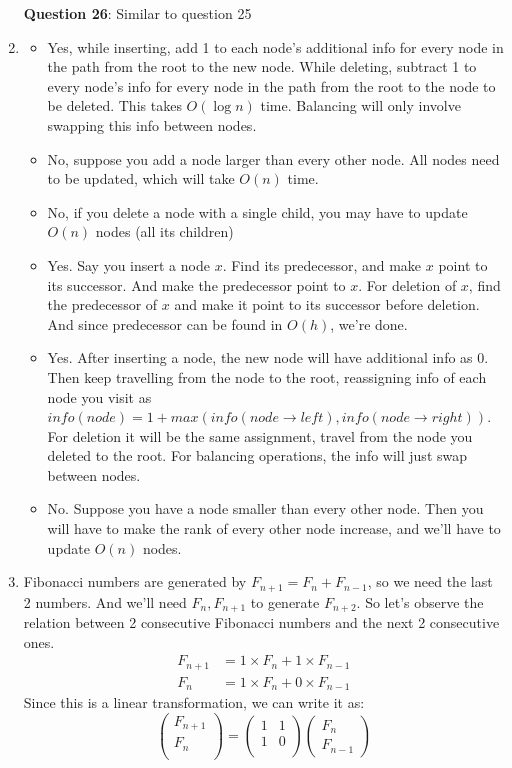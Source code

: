 \documentclass[12pt]{report}
\begin{document}
\begin{enumerate}[label=\textbf{\arabic*.}]
  \textbf{Question 26}:
  Similar to question 25

  \item 
  \begin{itemize}
    \item Yes, while inserting, add 1 to each node's additional info for every node in the path from the root to the new node. While deleting, 
    subtract 1 to every node's info for every node in the path from the root to the node to be deleted. This takes $O(\log n)$ time. Balancing 
    will only involve swapping this info between nodes.
    \item No, suppose you add a node larger than every other node. All nodes need to be updated, which will take $O(n)$ time.
    \item No, if you delete a node with a single child, you may have to update $O(n)$ nodes (all its children)
    \item Yes. Say you insert a node $x$. Find its predecessor, and make $x$ point to its successor. And make the predecessor point to $x$. For
    deletion of $x$, find the predecessor of $x$ and make it point to its successor before deletion. And since predecessor can be found in $O(h)$,
    we're done.
    \item Yes. After inserting a node, the new node will have additional info as 0. Then keep travelling from the node to the root, reassigning info
    of each node you visit as $info(node) = 1 + max(info(node \rightarrow left), info(node \rightarrow right))$. For deletion it will be the same
    assignment, travel from the node you deleted to the root. For balancing operations, the info will just swap between nodes.
    \item No. Suppose you have a node smaller than every other node. Then you will have to make the rank of every other node increase, and we'll 
    have to update $O(n)$ nodes.
  \end{itemize}

  \item Fibonacci numbers are generated by $F_{n+1} = F_n + F_{n-1}$, so we need the last 2 numbers. And we'll need $F_n, F_{n+1}$ to generate $F_{n+2}$.
  So let's observe the relation between 2 consecutive Fibonacci numbers and the next 2 consecutive ones.
  \begin{align*}
    F_{n+1} &= 1 \times F_n + 1 \times F_{n-1} \\
    F_n &= 1 \times F_n + 0 \times F_{n-1}
  \end{align*}
  Since this is a linear transformation, we can write it as:
  \[
  \begin{pmatrix}
    F_{n+1} \\
    F_n \\
  \end{pmatrix}
  =
  \begin{pmatrix}
    1 & 1 \\
    1 & 0 \\
  \end{pmatrix}
  \begin{pmatrix}
    F_n \\
    F_{n-1}
  \end{pmatrix}
  \]


\end{enumerate}
\end{document}
